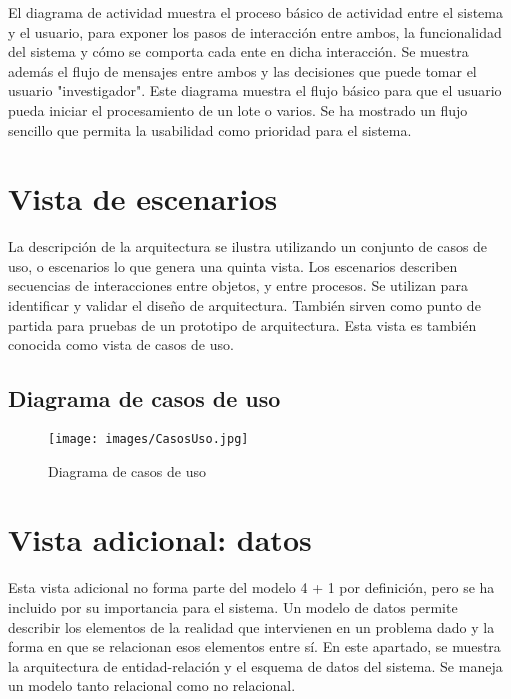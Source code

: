 \documentclass{scrreprt}
\begin{document}
El diagrama de actividad muestra el proceso básico de actividad entre el sistema y el usuario, para exponer los pasos de interacción entre ambos, la funcionalidad del sistema y cómo se comporta cada ente en dicha interacción. Se muestra además el flujo de mensajes entre ambos y las decisiones que puede tomar el usuario "investigador". Este diagrama muestra el flujo básico para que el usuario pueda iniciar el procesamiento de un lote o varios. Se ha mostrado un flujo sencillo que permita la usabilidad como prioridad para el sistema.

\chapter{Vista de escenarios}

La descripción de la arquitectura se ilustra utilizando un conjunto de casos de uso, o escenarios lo que genera una quinta vista. Los escenarios describen secuencias de interacciones entre objetos, y entre procesos. Se utilizan para identificar y validar el diseño de arquitectura. También sirven como punto de partida para pruebas de un prototipo de arquitectura. Esta vista es también conocida como vista de casos de uso.\\

\section{Diagrama de casos de uso}

\begin{figure}[H]
	\centering
    \texttt{[image: images/CasosUso.jpg]}
    \caption{Diagrama de casos de uso}
\end{figure}



\chapter{Vista adicional: datos}

Esta vista adicional no forma parte del modelo 4 + 1 por definición, pero se ha incluido por su importancia para el sistema. Un modelo de datos permite describir los elementos de la realidad que intervienen en un problema dado y la forma en que se relacionan esos elementos entre sí. En este apartado, se muestra la arquitectura de entidad-relación y el esquema de datos del sistema. Se maneja un modelo tanto relacional como no relacional.\\
\end{document}
